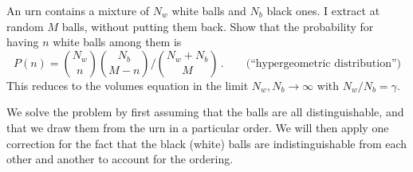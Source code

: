 

An urn contains a mixture of $N_w$ white balls and $N_b$ black ones.
I extract at random $M$ balls, without putting them back.
Show that the probability for having $n$ white balls among them is
\begin{equation*}
  P(n)
  = \binom{N_w}{n} \binom{N_b}{M-n} / \binom{N_w + N_b}{M}
  \, . \qquad \text{(``hypergeometric distribution'')}
\end{equation*}
This reduces to the volumes equation in the limit $N_w, N_b \rightarrow \infty$ with $N_w/N_b = \gamma$.


We solve the problem by first assuming that the balls are all distinguishable, and that we draw them from the urn in a particular order.
We will then apply one correction for the fact that the black (white) balls are indistinguishable from each other and another to account for the ordering.

